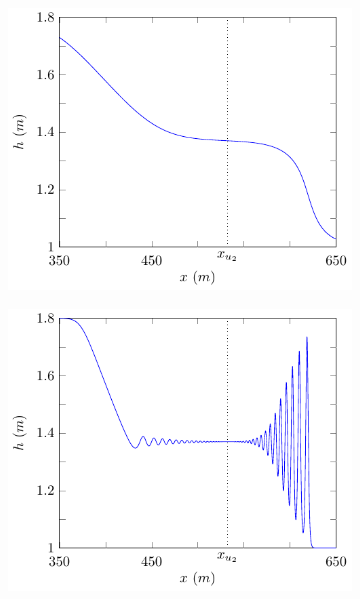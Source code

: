 \documentclass[times]{elsarticle}
\begin{document}
\begin{figure}
	\centering
	\begin{subfigure}{0.5\textwidth}
		\includegraphics[width=\textwidth]{Figure-4.pdf}
	\end{subfigure}%
	\begin{subfigure}{0.5\textwidth}
		\includegraphics[width=\textwidth]{Figure-5.pdf}

\end{subfigure}
\end{figure}
\end{document}
